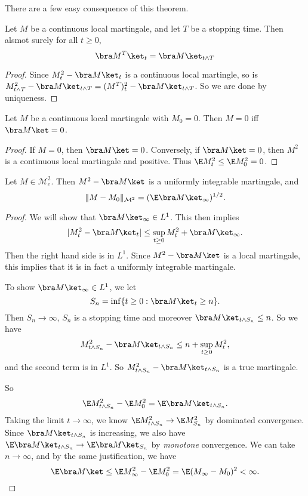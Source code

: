 \documentclass[a4paper]{article}
\begin{document}
There are a few easy consequence of this theorem.

\begin{fact}
  Let $M$ be a continuous local martingale, and let $T$ be a stopping time. Then alsmot surely for all $t \geq 0$,
  \[
    \bra M^T\ket_t = \bra M\ket_{t \wedge T}
  \]
\end{fact}

\begin{proof}
  Since $M_t^2 - \bra M\ket_t$ is a continuous local martingle, so is $M^2_{t \wedge T} - \bra M\ket_{t \wedge T} = (M^T)_t^2 - \bra M\ket_{t \wedge T}$. So we are done by uniqueness.
\end{proof}

\begin{fact}
  Let $M$ be a continuous local martingale with $M_0 = 0$. Then $M = 0$ iff $\bra M\ket = 0$.
\end{fact}

\begin{proof}
  If $M = 0$, then $\bra M \ket = 0$. Conversely, if $\bra M\ket = 0$, then $M^2$ is a continuous local martingale and positive. Thus $\E M_t^2 \leq \E M_0^2 = 0$.
\end{proof}

\begin{prop}
  Let $M \in \mathcal{M}_c^2$. Then $M^2 - \bra M\ket$ is a uniformly integrable martingale, and
  \[
    \|M - M_0\|_{\mathcal{M}^2} = (\E \bra M\ket_\infty)^{1/2}.
  \]
\end{prop}

\begin{proof}
  We will show that $\bra M\ket_\infty \in L^1$. This then implies
  \[
    |M_t^2 - \bra M\ket_t| \leq \sup_{t \geq 0} M_t^2 + \bra M\ket_\infty.
  \]
  Then the right hand side is in $L^1$. Since $M^2 - \bra M\ket$ is a local martingale, this implies that it is in fact a uniformly integrable martingale.

  To show $\bra M\ket_\infty \in L^1$, we let
  \[
    S_n = \inf \{t \geq 0: \bra M\ket_t \geq n\}.
  \]
  Then $S_n \to \infty$, $S_n$ is a stopping time and moreover $\bra M\ket_{t \wedge S_n} \leq n$. So we have
  \[
    M_{t \wedge S_n}^2 - \bra M\ket_{t \wedge S_n} \leq n + \sup_{t \geq 0} M_t^2,
  \]
  and the second term is in $L^1$. So $M_{t \wedge S_n}^2 - \bra M\ket_{t \wedge S_n}$ is a true martingale.

  So
  \[
    \E M_{t \wedge S_n}^2 - \E M_0^2 = \E \bra M\ket_{t \wedge S_n}.
  \]
  Taking the limit $t\to \infty$, we know $\E M_{t \wedge S_n}^2 \to \E M^2_{S_n}$ by dominated convergence. Since $\bra M\ket_{t \wedge S_n}$ is increasing, we also have $\E \bra M\ket_{t \wedge S_n} \to \E \bra M\ket_{S_n}$ by \emph{monotone} convergence. We can take $n \to \infty$, and by the same justification, we have
  \[
    \E \bra M\ket \leq \E M_\infty^2 - \E M_0^2 = \E (M_\infty - M_0)^2 < \infty.\qedhere
  \]
\end{proof}
\end{document}
